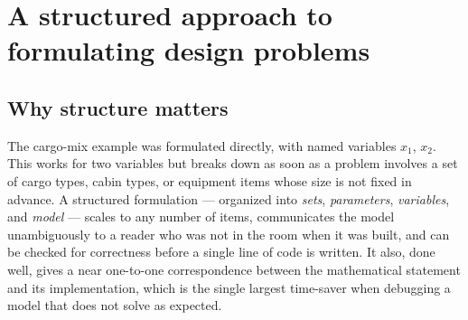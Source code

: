 \begin{center}
\end{center}

\section{A structured approach to formulating design problems}
\label{sec:structured-formulation}

\subsection{Why structure matters}

The cargo-mix example was formulated directly, with named variables
$x_1$, $x_2$. This works for two variables but breaks down as soon as a
problem involves a set of cargo types, cabin types, or equipment items
whose size is not fixed in advance. A structured formulation — organized
into \emph{sets}, \emph{parameters}, \emph{variables}, and \emph{model} —
scales to any number of items, communicates the model unambiguously to a
reader who was not in the room when it was built, and can be checked for
correctness before a single line of code is written. It also, done well,
gives a near one-to-one correspondence between the mathematical statement
and its implementation, which is the single largest time-saver when
debugging a model that does not solve as expected.

